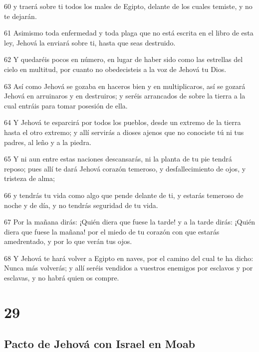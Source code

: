 \par 60 y traerá sobre ti todos los males de Egipto, delante de los cuales temiste, y no te dejarán.
\par 61 Asimismo toda enfermedad y toda plaga que no está escrita en el libro de esta ley, Jehová la enviará sobre ti, hasta que seas destruido.
\par 62 Y quedaréis pocos en número, en lugar de haber sido como las estrellas del cielo en multitud, por cuanto no obedecisteis a la voz de Jehová tu Dios.
\par 63 Así como Jehová se gozaba en haceros bien y en multiplicaros, así se gozará Jehová en arruinaros y en destruiros; y seréis arrancados de sobre la tierra a la cual entráis para tomar posesión de ella.
\par 64 Y Jehová te esparcirá por todos los pueblos, desde un extremo de la tierra hasta el otro extremo; y allí servirás a dioses ajenos que no conociste tú ni tus padres, al leño y a la piedra.
\par 65 Y ni aun entre estas naciones descansarás, ni la planta de tu pie tendrá reposo; pues allí te dará Jehová corazón temeroso, y desfallecimiento de ojos, y tristeza de alma;
\par 66 y tendrás tu vida como algo que pende delante de ti, y estarás temeroso de noche y de día, y no tendrás seguridad de tu vida.
\par 67 Por la mañana dirás: ¡Quién diera que fuese la tarde! y a la tarde dirás: ¡Quién diera que fuese la mañana! por el miedo de tu corazón con que estarás amedrentado, y por lo que verán tus ojos.
\par 68 Y Jehová te hará volver a Egipto en naves, por el camino del cual te ha dicho: Nunca más volverás; y allí seréis vendidos a vuestros enemigos por esclavos y por esclavas, y no habrá quien os compre.

\chapter{29}

\section{Pacto de Jehová con Israel en Moab}

